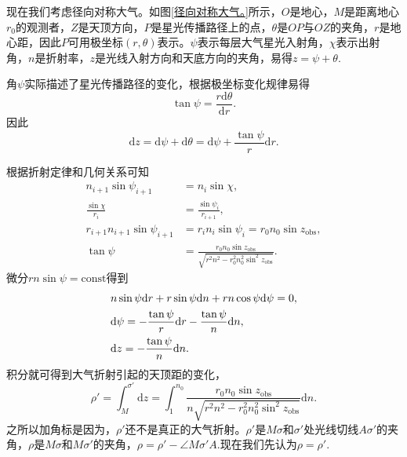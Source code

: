 \documentclass[11pt, a4paper, oneside]{ctexart}
\numberwithin{equation}{subsection}
\begin{document}
现在我们考虑径向对称大气。如图\ref{径向对称大气。}所示，$O$是地心，$M$是距离地心$r_{0}$的观测者，$Z$是天顶方向，$P$是星光传播路径上的点，$\theta$是$OP$与$OZ$的夹角，$r$是地心距，因此$P$可用极坐标$\left(r,\theta\right)$表示。$\psi$表示每层大气星光入射角，$\chi$表示出射角，$n$是折射率，$z$是光线入射方向和天底方向的夹角，易得$z=\psi+\theta$.

角$\psi$实际描述了星光传播路径的变化，根据极坐标变化规律易得
\begin{equation}
\tan\psi=\frac{r\mathrm{d}\theta}{\mathrm{d}r}.
\end{equation}
因此
\begin{equation}
\mathrm{d}z=\mathrm{d}\psi+\mathrm{d}\theta=\mathrm{d}\psi+\frac{\tan\psi}{r}\mathrm{d}r.
\end{equation}

根据折射定律和几何关系可知
\begin{align}
n_{i+1}\sin\psi_{i+1}&=n_{i}\sin\chi,\\
\frac{\sin\chi}{r_{i}}&=\frac{\sin\psi_{i}}{r_{i+1}},\\
r_{i+1}n_{i+1}\sin\psi_{i+1}&=r_{i}n_{i}\sin\psi_{i}=r_{0}n_{0}\sin z_{\text{obs}},\\
\tan\psi&=\frac{r_{0}n_{0}\sin z_{\text{obs}}}{\sqrt{r^{2}n^{2}-r_{0}^{2}n_{0}^{2}\sin^{2}z_{\text{obs}}}}.
\end{align}
微分$rn\sin\psi=\text{const}$得到
\begin{align}
&n\sin\psi\mathrm{d}r+r\sin\psi\mathrm{d}n+rn\cos\psi\mathrm{d}\psi=0,\notag\\
&\mathrm{d}\psi=-\frac{\tan\psi}{r}\mathrm{d}r-\frac{\tan\psi}{n}\mathrm{d}n,\notag\\
&\mathrm{d}z=-\frac{\tan\psi}{n}\mathrm{d}n.
\end{align}
积分就可得到大气折射引起的天顶距的变化，
\begin{equation}
\rho'=\int_{M}^{\sigma'}\mathrm{d}z=\int_{1}^{n_{0}}\frac{r_{0}n_{0}\sin z_{\text{obs}}}{n\sqrt{r^{2}n^{2}-r_{0}^{2}n_{0}^{2}\sin^{2}z_{\text{obs}}}}\mathrm{d}n.\label{2.2.8}
\end{equation}
之所以加角标是因为，$\rho'$还不是真正的大气折射。$\rho'$是$M\sigma$和$\sigma'$处光线切线$A\sigma'$的夹角，$\rho$是$M\sigma$和$M\sigma'$的夹角，$\rho=\rho'-\angle{M\sigma'A}$.现在我们先认为$\rho=\rho'$.
\end{document}
